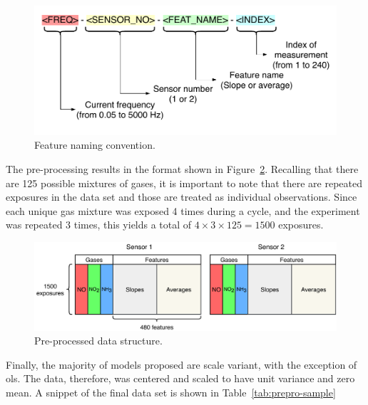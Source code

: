 \begin{figure}[h]
	\centering
	\includegraphics[width=1\textwidth]{../figures/feat-naming.pdf}
	\caption{Feature naming convention.}
	\label{fig:feat-naming}
\end{figure}

The pre-processing results in the format shown in Figure~\ref{fig:preprocessed-data}. Recalling that there are 125 possible mixtures of gases, it is important to note that there are repeated exposures in the data set and those are treated as individual observations. Since each unique gas mixture was exposed 4 times during a cycle, and the experiment was repeated 3 times, this yields a total of $4 \times 3 \times 125 = 1500$ exposures.

\begin{figure}[h]
	\centering
	\includegraphics[width=1\textwidth]{../figures/preprocessed-data.pdf}
	\caption{Pre-processed data structure.}
	\label{fig:preprocessed-data}
\end{figure}

Finally, the majority of models proposed are scale variant, with the exception of \acrshort{ols}. The data, therefore, was centered and scaled to have unit variance and zero mean. A snippet of the final data set is shown in Table~\ref{tab:prepro-sample}


